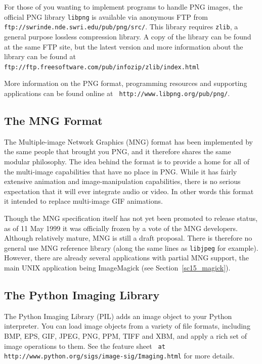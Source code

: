 \documentclass[twoside,11pt]{article}
\newcommand{\htmladdnormallink}[2]{#1}
\newcommand{\htmlref}[2]{#1}
\newcommand{\latex}[1]{#1}
\newcommand{\xlabel}[1]{}
\begin{document}
For those of you wanting to implement programs to handle PNG images,
the official PNG library {\tt libpng} is available via anonymous FTP
from \htmladdnormallink{{\tt
ftp://swrinde.nde.swri.edu/pub/png/src/}}{ftp://swrinde.nde.swri.edu/pub/png/src/}.
This library requires {\tt zlib}, a general purpose lossless
compression library. A copy of the library can be found at the same
FTP site, but the latest version and more information about the
library can be found at \htmladdnormallink{{\tt
ftp://ftp.freesoftware.com/pub/infozip/zlib/index.html}}{ftp://ftp.freesoftware.com/pub/infozip/zlib/index.html}

More information on the PNG format, programming resources and
supporting applications can be found online at \htmladdnormallink{{\tt
http://www.libpng.org/pub/png/}}{http://www.libpng.org/pub/png/}.

\subsection{\xlabel{sc15_mng}The MNG Format\label{sc15_mng}}

The \htmladdnormallink{Multiple-image Network
Graphics}{http://www.libpng.org/pub/mng/} (MNG) format has been
implemented by the same people that brought you PNG, and it therefore
shares the same modular philosophy. The idea behind the format is to
provide a home for all of the multi-image capabilities that have no
place in PNG. While it has fairly extensive animation and
image-manipulation capabilities, there is no serious expectation that
it will ever integrate audio or video. In other words this format it
intended to replace multi-image GIF animations.

Though the MNG specification itself has not yet been promoted to
release status, as of 11 May 1999 it was officially frozen by a vote
of the MNG developers. Although relatively mature, MNG is still a
draft proposal. There is therefore no general use MNG reference
library (along the same lines as {\tt libjpeg} for example). However,
there are already several applications with partial MNG support, the
main UNIX application being \htmlref{ImageMagick}{sc15_magick}\latex{
(see Section~\ref{sc15_magick})}.

\subsection{\xlabel{sc15_pythonimg}The Python Imaging Library\label{sc15_pythonimg}}

The \htmladdnormallink{Python Imaging
Library}{http://www.python.org/sigs/image-sig/Imaging.html} (PIL) adds
an image object to your Python interpreter. You can load image objects
from a variety of file formats, including BMP, EPS, GIF, JPEG, PNG,
PPM, TIFF and XBM, and apply a rich set of image operations to them.
See the \htmladdnormallink{feature
sheet}{http://www.python.org/sigs/image-sig/Features.html} \latex{{\tt
at http://www.python.org/sigs/image-sig/Imaging.html}} for more
details. 
\end{document}
